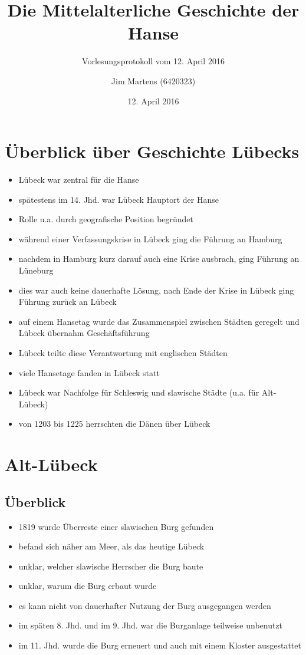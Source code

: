 \documentclass[10pt,a4paper,oneside,ngerman,numbers=noenddot]{scrartcl}
\newenvironment{myitemize}{\begin{itemize}\itemsep -2pt}{\end{itemize}} %
\begin{document}
\author{Jim Martens (6420323)}
\title{Die Mittelalterliche Geschichte der Hanse}
\subtitle{Vorlesungsprotokoll vom 12. April 2016}
\date{12. April 2016}
\maketitle

\section*{Überblick über Geschichte Lübecks}

\begin{myitemize}
    \item Lübeck war zentral für die Hanse
    \item spätestens im 14. Jhd. war Lübeck Hauptort der Hanse
    \item Rolle u.a. durch geografische Position begründet
    \item während einer Verfassungskrise in Lübeck ging die Führung an Hamburg
    \item nachdem in Hamburg kurz darauf auch eine Krise ausbrach, ging Führung an Lüneburg
    \item dies war auch keine dauerhafte Lösung, nach Ende der Krise in Lübeck ging Führung zurück an Lübeck
    \item auf einem Hansetag wurde das Zusammenspiel zwischen Städten geregelt und Lübeck übernahm Geschäftsführung
    \item Lübeck teilte diese Verantwortung mit englischen Städten
    \item viele Hansetage fanden in Lübeck statt
    \item Lübeck war Nachfolge für Schleswig und slawische Städte (u.a. für Alt-Lübeck)
    \item von 1203 bis 1225 herrschten die Dänen über Lübeck
\end{myitemize}

\section*{Alt-Lübeck}

\subsection*{Überblick}
\begin{myitemize}
    \item 1819 wurde Überreste einer slawischen Burg gefunden
    \item befand sich näher am Meer, als das heutige Lübeck
    \item unklar, welcher slawische Herrscher die Burg baute
    \item unklar, warum die Burg erbaut wurde
    \item es kann nicht von dauerhafter Nutzung der Burg ausgegangen werden
    \item im späten 8. Jhd. und im 9. Jhd. war die Burganlage teilweise unbenutzt
    \item im 11. Jhd. wurde die Burg erneuert und auch mit einem Kloster ausgestattet
\end{myitemize}
\end{document}
